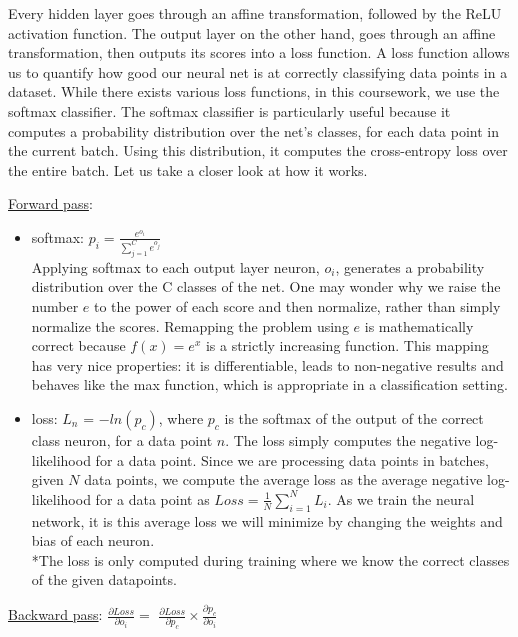 Every hidden layer goes through an affine transformation, followed by the ReLU activation function.
The output layer on the other hand,  goes through an affine transformation, then outputs its scores into a loss function.
A loss function allows us to quantify how good our neural net is at correctly classifying data points in a dataset.
While there exists various loss functions, in this coursework, we use the softmax classifier.
The softmax classifier is particularly useful because it computes a probability distribution over the net's classes, for each data point in the current batch.
Using this distribution, it computes the cross-entropy loss over the entire batch.
Let us take a closer look at how it works.

\underline{Forward pass}:

\begin{itemize}[topsep=-10pt]
   \item softmax: $p_i = \frac{e^{o_i}}{\sum_{j=1}^{C} e^{o_j}}$\\
     Applying softmax to each output layer neuron, $o_i$, generates a probability distribution over the C classes of the net.
     One may wonder why we raise the number $e$ to the power of each score and then normalize,
     rather than simply normalize the scores. Remapping the problem using $e$ is mathematically correct because
     $f(x) = e^x$ is a strictly increasing function.
     This mapping has very nice properties: it is differentiable, leads to non-negative results and behaves like the max function,
     which is appropriate in a classification setting.
     
   \item loss: $L_n$ = $-ln(p_c)$, where $p_c$ is the softmax of the output of the correct class neuron, for a data point $n$.
     The loss simply computes the negative log-likelihood for a data point.
     Since we are processing data points in batches, given $N$ data points,
     we compute the average loss as the average negative log-likelihood for a data point as $Loss = \frac{1}{N}\sum_{i=1}^{N}L_i$.
     As we train the neural network, it is this average loss we will minimize by changing the weights and bias of each neuron.\\
     *The loss is only computed during training where we know the correct classes of the given datapoints.\\
          
\end{itemize}


\underline{Backward pass}: $\frac{\partial Loss}{\partial o_i} = $
$\frac{\partial Loss}{\partial p_c} \times \frac{\partial p_c}{\partial o_i}$

